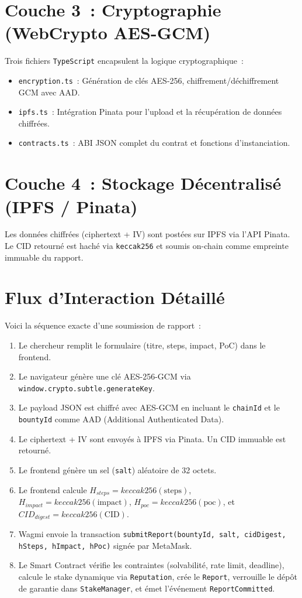 \documentclass[12pt, a4paper]{report}
\begin{document}
\section{Couche 3~: Cryptographie (WebCrypto AES-GCM)}
Trois fichiers \texttt{TypeScript} encapsulent la logique cryptographique~:
\begin{itemize}
    \item \texttt{encryption.ts}~: G\'{e}n\'{e}ration de cl\'{e}s AES-256, chiffrement/d\'{e}chiffrement GCM avec AAD.
    \item \texttt{ipfs.ts}~: Int\'{e}gration Pinata pour l'upload et la r\'{e}cup\'{e}ration de donn\'{e}es chiffr\'{e}es.
    \item \texttt{contracts.ts}~: ABI JSON complet du contrat et fonctions d'instanciation.
\end{itemize}

\section{Couche 4~: Stockage D\'{e}centralis\'{e} (IPFS / Pinata)}
Les donn\'{e}es chiffr\'{e}es (ciphertext + IV) sont post\'{e}es sur IPFS via l'API Pinata. Le CID retourn\'{e} est hach\'{e} via \texttt{keccak256} et soumis on-chain comme empreinte immuable du rapport.

\section{Flux d'Interaction D\'{e}taill\'{e}}
Voici la s\'{e}quence exacte d'une soumission de rapport~:
\begin{enumerate}
    \item Le chercheur remplit le formulaire (titre, steps, impact, PoC) dans le frontend.
    \item Le navigateur g\'{e}n\`{e}re une cl\'{e} AES-256-GCM via \texttt{window.crypto.subtle.generateKey}.
    \item Le payload JSON est chiffr\'{e} avec AES-GCM en incluant le \texttt{chainId} et le \texttt{bountyId} comme AAD (Additional Authenticated Data).
    \item Le ciphertext + IV sont envoy\'{e}s \`{a} IPFS via Pinata. Un CID immuable est retourn\'{e}.
    \item Le frontend g\'{e}n\`{e}re un sel (\texttt{salt}) al\'{e}atoire de 32 octets.
    \item Le frontend calcule $H_{steps} = keccak256(\text{steps})$, $H_{impact} = keccak256(\text{impact})$, $H_{poc} = keccak256(\text{poc})$, et $CID_{digest} = keccak256(\text{CID})$.
    \item Wagmi envoie la transaction \texttt{submitReport(bountyId, salt, cidDigest, hSteps, hImpact, hPoc)} sign\'{e}e par MetaMask.
    \item Le Smart Contract v\'{e}rifie les contraintes (solvabilit\'{e}, rate limit, deadline), calcule le stake dynamique via \texttt{Reputation}, cr\'{e}e le \texttt{Report}, verrouille le d\'{e}p\^{o}t de garantie dans \texttt{StakeManager}, et \'{e}met l'\'{e}v\'{e}nement \texttt{ReportCommitted}.
\end{enumerate}
\end{document}
